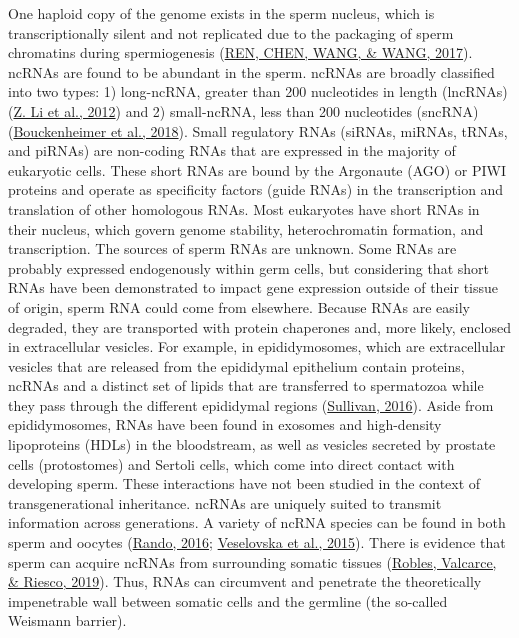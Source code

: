 \documentclass[12pt,twoside]{reedthesis}
\begin{document}
One haploid copy of the genome exists in the sperm nucleus, which is
transcriptionally silent and not replicated due to the packaging of
sperm chromatins during spermiogenesis (\protect\hyperlink{ref-ren2017}{REN, CHEN, WANG, \& WANG, 2017}). ncRNAs are found to
be abundant in the sperm. ncRNAs are broadly classified into two types:
1) long-ncRNA, greater than 200 nucleotides in length (lncRNAs)
(\protect\hyperlink{ref-li2012}{Z. Li et al., 2012}) and 2) small-ncRNA, less than 200 nucleotides (sncRNA)
(\protect\hyperlink{ref-bouckenheimer2018}{Bouckenheimer et al., 2018}). Small regulatory RNAs (siRNAs, miRNAs, tRNAs, and
piRNAs) are non-coding RNAs that are expressed in the majority of
eukaryotic cells. These short RNAs are bound by the Argonaute (AGO) or
PIWI proteins and operate as specificity factors (guide RNAs) in the
transcription and translation of other homologous RNAs. Most eukaryotes
have short RNAs in their nucleus, which govern genome stability,
heterochromatin formation, and transcription. The sources of sperm RNAs
are unknown. Some RNAs are probably expressed endogenously within germ
cells, but considering that short RNAs have been demonstrated to impact
gene expression outside of their tissue of origin, sperm RNA could come
from elsewhere. Because RNAs are easily degraded, they are transported
with protein chaperones and, more likely, enclosed in extracellular
vesicles. For example, in epididymosomes, which are extracellular
vesicles that are released from the epididymal epithelium contain
proteins, ncRNAs and a distinct set of lipids that are transferred to
spermatozoa while they pass through the different epididymal regions
(\protect\hyperlink{ref-sullivan2016}{Sullivan, 2016}). Aside from epididymosomes, RNAs have been found in
exosomes and high-density lipoproteins (HDLs) in the bloodstream, as
well as vesicles secreted by prostate cells (protostomes) and Sertoli
cells, which come into direct contact with developing sperm. These
interactions have not been studied in the context of transgenerational
inheritance. ncRNAs are uniquely suited to transmit information across
generations. A variety of ncRNA species can be found in both sperm and
oocytes (\protect\hyperlink{ref-rando2016}{Rando, 2016}; \protect\hyperlink{ref-veselovska2015}{Veselovska et al., 2015}). There is evidence that sperm can
acquire ncRNAs from surrounding somatic tissues (\protect\hyperlink{ref-robles2019}{Robles, Valcarce, \& Riesco, 2019}). Thus,
RNAs can circumvent and penetrate the theoretically impenetrable wall
between somatic cells and the germline (the so-called Weismann barrier).
\end{document}
